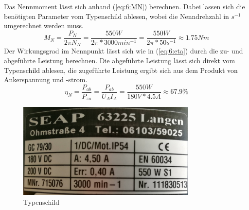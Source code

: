\chapter{}

\section{}
Das Nennmoment lässt sich anhand (\ref{eq:6:MN}) berechnen. Dabei lassen sich die benötigten Parameter vom Typenschild ablesen, wobei die Nenndrehzahl in $ s^{-1} $ umgerechnet werden muss.
\begin{equation}
	M_{N} = \frac{P_{N}}{2\pi N_{N}} = \frac{550W}{2\pi*3000min^{-1}} = \frac{550W}{2\pi*50s^{-1}} \approx 1.75Nm
	\label{eq:6:MN}
\end{equation}
Der Wirkungsgrad im Nennpunkt lässt sich wie in (\ref{eq:6:eta}) durch die zu- und abgeführte Leistung berechnen. Die abgeführte Leistung lässt sich direkt vom Typenschild ablesen, die zugeführte Leistung ergibt sich aus dem Produkt von Ankerspannung und -strom.
\begin{equation}
	\eta_{N} = \frac{P_{ab}}{P_{zu}} = \frac{P_{ab}}{U_{A}I_{A}} = \frac{550W}{180V*4.5A} \approx 67.9\%
	\label{eq:6:eta}
\end{equation}

\begin{figure}[h]
	\centering
	\includegraphics[width=0.8\textwidth]{./bilder/typenschild.jpg}
	\caption{Typenschild}
	\label{fig:typenschild}
\end{figure}